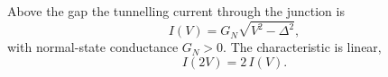 \documentclass{article}
\begin{document}
Above the gap the tunnelling current through the junction is
\begin{equation}
I(V) = G_N\sqrt{V^2-\Delta^2} ,
\label{eq:iv}
\end{equation}
with normal-state conductance $G_N>0$. The characteristic is linear,
\begin{equation}
I(2V) = 2\,I(V) .
\label{eq:lin}
\end{equation}
\end{document}
